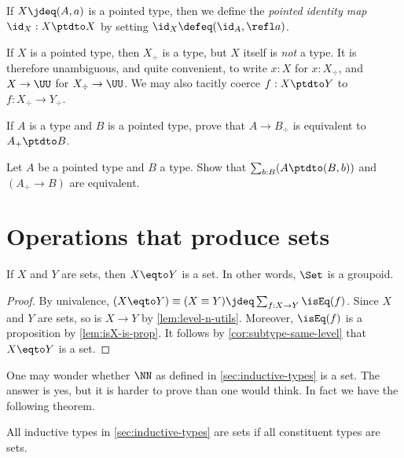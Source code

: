 \begin{definition}\label{def:pointedidentity}
  If $X \jdeq (A,a)$ is a pointed type, then we define the \emph{pointed identity map}
  $\id_X : X \ptdto X$ by setting $\id_X \defeq (\id_A, \refl a)$.
\end{definition}

If $X$ is a pointed type, then $X_\div $ is a type, but $X$ itself is
\emph{not} a type. It is therefore unambiguous, and quite convenient,
to write $x:X$ for $x:X_\div$, and $X\to\UU$ for $X_\div\to\UU$.
We may also tacitly coerce $f:X\ptdto Y$ to $f:X_\div \to Y_\div$.

\begin{xca}\label{xca:plusforgetadjoint}
If $A$ is a type and $B$ is a pointed type,
prove that $A\to B_\div$ is equivalent to $A_+\ptdto B$.
\end{xca}

\begin{xca}\label{xca:freemaps}
  Let $A$ be a pointed type and $B$ a type.
  Show that $\sum_{b:B}(A\ptdto (B,b))$ and $(A_\div\to B)$ are equivalent.
\end{xca}


\section{Operations that produce sets}
\label{sec:operations-on-sets}

\begin{lemma}\label{lem:Set-is-groupoid}
If $X$ and $Y$ are sets, then $X \eqto Y$ is a set.
In other words, $\Set$ is a groupoid.
\end{lemma}

\begin{proof}
    By univalence, $(X \eqto Y) \equiv (X\equiv Y) \jdeq \sum_{f:X\to Y} \isEq(f)$. Since $X$ and $Y$ are sets,
    so is $X\to Y$ by \cref{lem:level-n-utils}. Moreover,
    $\isEq(f)$ is a proposition by \cref{lem:isX-is-prop}.
    It follows by \cref{cor:subtype-same-level} that $X \eqto Y$ is a set.
\end{proof}

One may wonder whether $\NN$ as defined in \cref{sec:inductive-types}
is a set. The answer is yes, but it is harder to prove than one
would think. In fact we have the following theorem.

\begin{theorem}\label{thm:isset-inductive-types}
All inductive types in \cref{sec:inductive-types} are sets
if all constituent types are sets.
\end{theorem}

